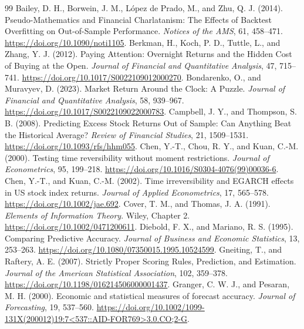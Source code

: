 \begin{thebibliography}{99}
 Bailey, D. H., Borwein, J. M., López de Prado, M., and Zhu, Q. J. (2014). Pseudo-Mathematics and Financial Charlatanism: The Effects of Backtest Overfitting on Out-of-Sample Performance. \textit{Notices of the AMS}, 61, 458--471. \url{https://doi.org/10.1090/noti1105}.
 Berkman, H., Koch, P. D., Tuttle, L., and Zhang, Y. J. (2012). Paying Attention: Overnight Returns and the Hidden Cost of Buying at the Open. \textit{Journal of Financial and Quantitative Analysis}, 47, 715--741. \url{https://doi.org/10.1017/S0022109012000270}.
 Bondarenko, O., and Muravyev, D. (2023). Market Return Around the Clock: A Puzzle. \textit{Journal of Financial and Quantitative Analysis}, 58, 939--967. \url{https://doi.org/10.1017/S0022109022000783}.
 Campbell, J. Y., and Thompson, S. B. (2008). Predicting Excess Stock Returns Out of Sample: Can Anything Beat the Historical Average? \textit{Review of Financial Studies}, 21, 1509--1531. \url{https://doi.org/10.1093/rfs/hhm055}.
 Chen, Y.-T., Chou, R. Y., and Kuan, C.-M. (2000). Testing time reversibility without moment restrictions. \textit{Journal of Econometrics}, 95, 199--218. \url{https://doi.org/10.1016/S0304-4076(99)00036-6}.
 Chen, Y.-T., and Kuan, C.-M. (2002). Time irreversibility and EGARCH effects in US stock index returns. \textit{Journal of Applied Econometrics}, 17, 565--578. \url{https://doi.org/10.1002/jae.692}.
 Cover, T. M., and Thomas, J. A. (1991). \textit{Elements of Information Theory}. Wiley, Chapter 2. \url{https://doi.org/10.1002/0471200611}.
 Diebold, F. X., and Mariano, R. S. (1995). Comparing Predictive Accuracy. \textit{Journal of Business and Economic Statistics}, 13, 253--263. \url{https://doi.org/10.1080/07350015.1995.10524599}.
 Gneiting, T., and Raftery, A. E. (2007). Strictly Proper Scoring Rules, Prediction, and Estimation. \textit{Journal of the American Statistical Association}, 102, 359--378. \url{https://doi.org/10.1198/016214506000001437}.
 Granger, C. W. J., and Pesaran, M. H. (2000). Economic and statistical measures of forecast accuracy. \textit{Journal of Forecasting}, 19, 537--560. \url{https://doi.org/10.1002/1099-131X(200012)19:7<537::AID-FOR769>3.0.CO;2-G}.

\end{thebibliography}
